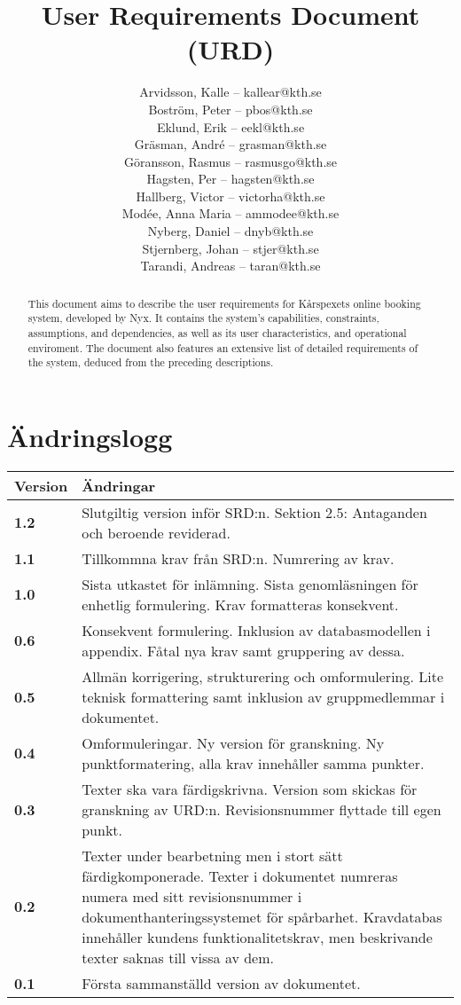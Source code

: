 \documentclass[a4paper, twoside, 11pt, titlepage]{article}
\author{
	\small
	Arvidsson, Kalle -- kallear@kth.se\\
	Boström, Peter -- pbos@kth.se\\
	Eklund, Erik -- eekl@kth.se\\
	Gräsman, André -- grasman@kth.se\\
	Göransson, Rasmus -- rasmusgo@kth.se\\
	Hagsten, Per -- hagsten@kth.se\\
	Hallberg, Victor -- victorha@kth.se\\
	Modée, Anna Maria -- ammodee@kth.se\\
	Nyberg, Daniel -- dnyb@kth.se\\
	Stjernberg, Johan -- stjer@kth.se\\
	Tarandi, Andreas -- taran@kth.se
	}
\title{User Requirements Document (URD)}
\begin{document}
\maketitle

\clearpage
\thispagestyle{empty}
\mbox{}
\newpage

\begin{abstract}
	This document aims to describe the user requirements for Kårspexets online booking system, developed by Nyx. It contains the system's capabilities, constraints, assumptions, and dependencies, as well as its user characteristics, and operational enviroment. The document also features an extensive list of detailed requirements of the system, deduced from the preceding descriptions.
\end{abstract}

\newpage

\setcounter{page}{1}

\startfooter

\clearpage
\section*{Ändringslogg}


\begin{tabular} { p{2.6cm} p{12.5cm} }
	\hline
	\sffamily\textbf{Version} & \sffamily\textbf{Ändringar } \\
	\hline
	\sffamily\textbf{1.2} & Slutgiltig version inför SRD:n. Sektion 2.5: Antaganden och beroende reviderad.  \\
	\hline
	\sffamily\textbf{1.1} & Tillkommna krav från SRD:n. Numrering av krav.  \\
	\hline
	\sffamily\textbf{1.0} & Sista utkastet för inlämning. Sista genomläsningen för enhetlig formulering. Krav formatteras konsekvent.  \\
	\hline
	\sffamily\textbf{0.6} & Konsekvent formulering. Inklusion av databasmodellen i appendix. Fåtal nya krav samt gruppering av dessa.  \\
	\hline
	\sffamily\textbf{0.5} & Allmän korrigering, strukturering och omformulering. Lite teknisk formattering samt inklusion av gruppmedlemmar i dokumentet.  \\
	\hline
	\sffamily\textbf{0.4} & Omformuleringar. Ny version för granskning. Ny punktformatering, alla krav innehåller samma punkter.  \\
	\hline
	\sffamily\textbf{0.3} & Texter ska vara färdigskrivna. Version som skickas för granskning av URD:n. Revisionsnummer flyttade till egen punkt.  \\
	\hline
	\sffamily\textbf{0.2} & Texter under bearbetning men i stort sätt färdigkomponerade. Texter i dokumentet numreras numera med sitt revisionsnummer i dokumenthanteringssystemet för spårbarhet. Kravdatabas innehåller kundens funktionalitetskrav, men beskrivande texter saknas till vissa av dem.  \\
	\hline
	\sffamily\textbf{0.1} & Första sammanställd version av dokumentet.  \\
	\hline
\end{tabular}
\end{document}
